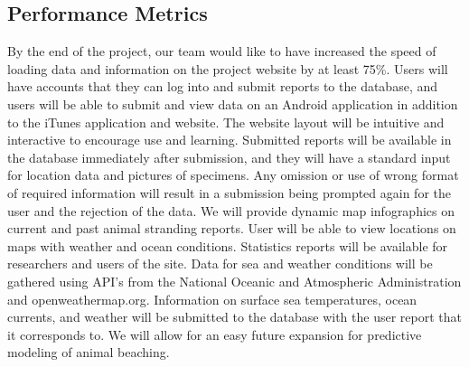 \documentclass[onecolumn, draftclsnofoot,10pt, compsoc]{IEEEtran}
\begin{document}
\begin{singlespace}
\section{Performance Metrics}
		By the end of the project, our team would like to have increased the speed of loading data and information on the project website by at least 75\%.  Users will have accounts 
		that they can log into and submit reports to the database, and users will be able to submit and view data on an Android application in addition to the iTunes application and 
		website.  The website layout will be intuitive and interactive to encourage use and learning.  Submitted reports will be available in the database immediately after submission,
		and they will have a standard input for location data and pictures of specimens.  Any omission or use of wrong format of required information will result in a submission being
		prompted again for the user and the rejection of the data.
		We will provide dynamic map infographics on current and past animal stranding reports.  User will be able to view locations on maps with weather and ocean conditions.  
		Statistics reports will be available for researchers and users of the site.
		Data for sea and weather conditions will be gathered using API's from the National Oceanic and Atmospheric Administration and openweathermap.org.
		Information on surface sea temperatures, ocean currents, and weather will be submitted to the database with the user report that it corresponds to.
		We will allow for an easy future expansion for predictive modeling of animal beaching.
\end{singlespace}
\end{document}
